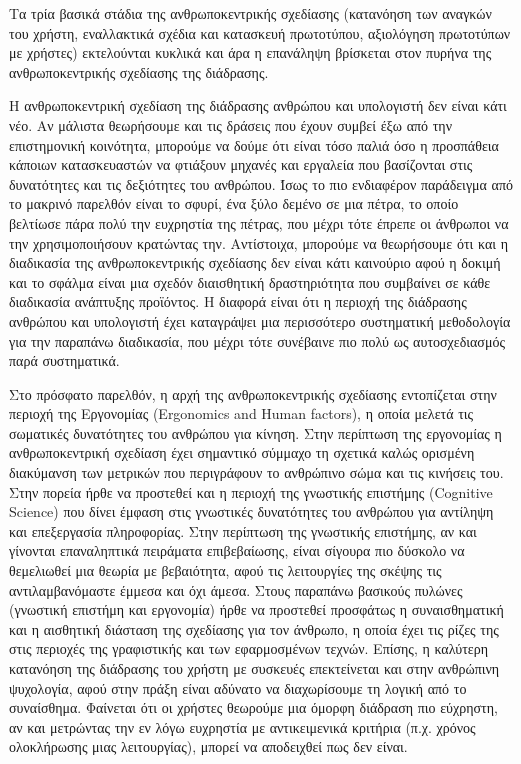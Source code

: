 \documentclass[
]{article}
\begin{document}
Τα τρία βασικά στάδια της ανθρωποκεντρικής σχεδίασης (κατανόηση των
αναγκών του χρήστη, εναλλακτικά σχέδια και κατασκευή πρωτοτύπου,
αξιολόγηση πρωτοτύπων με χρήστες) εκτελούνται κυκλικά και άρα η
επανάληψη βρίσκεται στον πυρήνα της ανθρωποκεντρικής σχεδίασης της
διάδρασης.

Η ανθρωποκεντρική σχεδίαση της διάδρασης ανθρώπου και υπολογιστή δεν
είναι κάτι νέο. Αν μάλιστα θεωρήσουμε και τις δράσεις που έχουν συμβεί
έξω από την επιστημονική κοινότητα, μπορούμε να δούμε ότι είναι τόσο
παλιά όσο η προσπάθεια κάποιων κατασκευαστών να φτιάξουν μηχανές και
εργαλεία που βασίζονται στις δυνατότητες και τις δεξιότητες του
ανθρώπου. Ίσως το πιο ενδιαφέρον παράδειγμα από το μακρινό παρελθόν
είναι το σφυρί, ένα ξύλο δεμένο σε μια πέτρα, το οποίο βελτίωσε πάρα
πολύ την ευχρηστία της πέτρας, που μέχρι τότε έπρεπε οι άνθρωποι να την
χρησιμοποιήσουν κρατώντας την. Αντίστοιχα, μπορούμε να θεωρήσουμε ότι
και η διαδικασία της ανθρωποκεντρικής σχεδίασης δεν είναι κάτι καινούριο
αφού η δοκιμή και το σφάλμα είναι μια σχεδόν διαισθητική δραστηριότητα
που συμβαίνει σε κάθε διαδικασία ανάπτυξης προϊόντος. Η διαφορά είναι
ότι η περιοχή της διάδρασης ανθρώπου και υπολογιστή έχει καταγράψει μια
περισσότερο συστηματική μεθοδολογία για την παραπάνω διαδικασία, που
μέχρι τότε συνέβαινε πιο πολύ ως αυτοσχεδιασμός παρά συστηματικά.

Στο πρόσφατο παρελθόν, η αρχή της ανθρωποκεντρικής σχεδίασης εντοπίζεται
στην περιοχή της Εργονομίας (Ergonomics and Human factors), η οποία
μελετά τις σωματικές δυνατότητες του ανθρώπου για κίνηση. Στην περίπτωση
της εργονομίας η ανθρωποκεντρική σχεδίαση έχει σημαντικό σύμμαχο τη
σχετικά καλώς ορισμένη διακύμανση των μετρικών που περιγράφουν το
ανθρώπινο σώμα και τις κινήσεις του. Στην πορεία ήρθε να προστεθεί και η
περιοχή της γνωστικής επιστήμης (Cognitive Science) που δίνει έμφαση
στις γνωστικές δυνατότητες του ανθρώπου για αντίληψη και επεξεργασία
πληροφορίας. Στην περίπτωση της γνωστικής επιστήμης, αν και γίνονται
επαναληπτικά πειράματα επιβεβαίωσης, είναι σίγουρα πιο δύσκολο να
θεμελιωθεί μια θεωρία με βεβαιότητα, αφού τις λειτουργίες της σκέψης τις
αντιλαμβανόμαστε έμμεσα και όχι άμεσα. Στους παραπάνω βασικούς πυλώνες
(γνωστική επιστήμη και εργονομία) ήρθε να προστεθεί προσφάτως η
συναισθηματική και η αισθητική διάσταση της σχεδίασης για τον άνθρωπο, η
οποία έχει τις ρίζες της στις περιοχές της γραφιστικής και των
εφαρμοσμένων τεχνών. Επίσης, η καλύτερη κατανόηση της διάδρασης του
χρήστη με συσκευές επεκτείνεται και στην ανθρώπινη ψυχολογία, αφού στην
πράξη είναι αδύνατο να διαχωρίσουμε τη λογική από το συναίσθημα.
Φαίνεται ότι οι χρήστες θεωρούμε μια όμορφη διάδραση πιο εύχρηστη, αν
και μετρώντας την εν λόγω ευχρηστία με αντικειμενικά κριτήρια (π.χ.
χρόνος ολοκλήρωσης μιας λειτουργίας), μπορεί να αποδειχθεί πως δεν
είναι.
\end{document}
